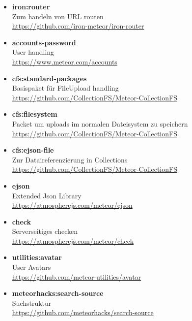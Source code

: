 \documentclass[Info_VK_Website_Dokumentation.tex]{subfiles}
\begin{document}
\begin{itemize}
 	\item \textbf{iron:router}\\
 	Zum handeln von URL routen \\
 	\small \url{https://github.com/iron-meteor/iron-router} 

 	\item \textbf{accounts-password}\\
 	User handling \\
 	\small \url{https://www.meteor.com/accounts} 

 	\item \textbf{cfs:standard-packages}\\
 	Basispaket für FileUpload handling\\
 	\small \url{https://github.com/CollectionFS/Meteor-CollectionFS} 

 	\item \textbf{cfs:filesystem}\\
 	Packet um uploads im normalen Dateisystem zu speichern\\
 	\small \url{https://github.com/CollectionFS/Meteor-CollectionFS} 

 	\item \textbf{cfs:ejson-file}\\
 	Zur Dataireferenzierung in Collections\\
 	\small \url{https://github.com/CollectionFS/Meteor-CollectionFS} \\ 

 	\item \textbf{ejson}\\
 	Extended Json Library\\
 	\small \url{https://atmospherejs.com/meteor/ejson}

 	\item \textbf{check}\\
 	Serverseitiges checken\\
 	\small \url{https://atmospherejs.com/meteor/check} 

 	\item \textbf{utilities:avatar}\\
 	User Avatars\\
 	\small \url{https://github.com/meteor-utilities/avatar} 

 	\item \textbf{meteorhacks:search-source}\\
 	Suchstruktur \\
 	\small \url{https://github.com/meteorhacks/search-source}


\end{itemize}
\end{document}
